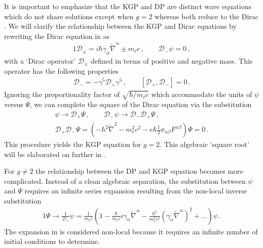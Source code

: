 It is important to emphasize that the KGP  and DP  are distinct wave equations which do not share solutions except when $g\!=\!2$ whereas both reduce to the Dirac . We will clarify the relationship between the KGP and Dirac equations by rewriting the Dirac equation in  as
\begin{alignat}{1}
	\label{do:1} \mathcal{D}_{\pm}=i\hbar\gamma_{\alpha}\widetilde\nabla^{\alpha}\pm m_{\ell}c\,,\qquad
    \mathcal{D}_{-}\psi=0\,,
\end{alignat}
with a `Dirac operator' $\mathcal{D}_{\pm}$ defined in terms of positive and negative mass. This operator has the following properties
\begin{gather}
    \label{do:2}
    \mathcal{D}_{-}=-\gamma^{5}\mathcal{D}_{+}\gamma^{5}\,,\qquad
    [\mathcal{D}_{+},\mathcal{D}_{-}]=0\,.
\end{gather}
Ignoring the proportionality factor of $\sqrt{\hbar/m_{\ell}c}$ which accommodate the units of $\psi$ versus $\Psi$, we can complete the square of the Dirac equation via the substitution
\begin{gather}
    \label{do:3a}
    \psi\rightarrow\mathcal{D}_{+}\Psi\,,\qquad
    \mathcal{D}_{-}\psi \rightarrow \mathcal{D}_{-}\mathcal{D}_{+}\Psi\,,\\
	\label{do:3}
    \mathcal{D}_{+}\mathcal{D}_{-}\Psi=\left(-\hbar^{2}\widetilde\nabla^{2}-m_{\ell}^{2}c^{2}-e\hbar\frac{1}{2}\sigma_{\alpha\beta}F^{\alpha\beta}\right)\Psi=0\,.
\end{gather}
This procedure yields the KGP equation for $g\!=\!2$. This algebraic `square root' will be elaborated on further in .

For $g\!\neq\!2$ the relationship between the DP and KGP equation becomes more complicated. Instead of a clean algebraic separation, the substitution between $\psi$ and $\Psi$ requires an infinite series expansion resulting from the non-local inverse substitution 
\begin{alignat}{1}
	\label{nonlocal:1} \Psi\rightarrow\frac{1}{\mathcal{D}_{+}}\psi = \frac{1}{m_{\ell}c}\left(1 - \frac{\hbar}{m_{\ell}c}i\gamma_{\alpha}\widetilde\nabla^{\alpha} - \frac{\hbar^{2}}{m_{\ell}^{2}c^{2}}\left(\gamma_{\alpha}\widetilde\nabla^{\alpha}\right)^{2} + \ldots\right)\psi\,.
\end{alignat}
The expansion in  is considered non-local because it requires an infinite number of initial conditions to determine.

